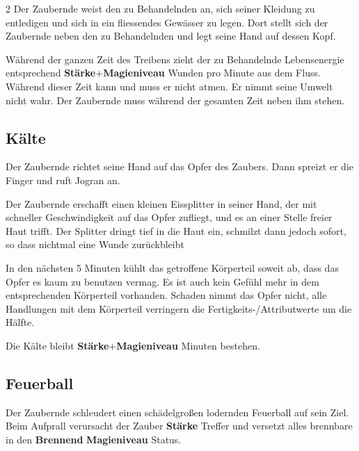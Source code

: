 \begin{multicols*}{2}
Der Zaubernde weist den zu Behandelnden an, sich seiner Kleidung zu entledigen und sich in ein fliessendes Gewässer zu legen. Dort stellt sich der Zaubernde neben den zu Behandelnden und legt seine Hand auf dessen Kopf.

Während der ganzen Zeit des Treibens zieht der zu Behandelnde Lebensenergie entsprechend \textbf{Stärke}+\textbf{Magieniveau} Wunden pro Minute aus dem Fluss. Während dieser Zeit kann und muss er nicht atmen. Er nimmt seine Umwelt nicht wahr. Der Zaubernde muss während der gesamten Zeit neben ihm stehen.



\subsection{Kälte}

Der Zaubernde richtet seine Hand auf das Opfer des Zaubers. Dann spreizt er die Finger und ruft Jogran an.

Der Zaubernde erschafft einen kleinen Eissplitter in seiner Hand, der mit schneller Geschwindigkeit auf das Opfer zufliegt, und es an einer Stelle freier Haut trifft. Der Splitter dringt tief in die Haut ein, schmilzt dann jedoch sofort, so dass nichtmal eine Wunde zurückbleibt

In den nächsten 5 Minuten kühlt das getroffene Körperteil soweit ab, dass das Opfer es kaum zu benutzen vermag. Es ist auch kein Gefühl mehr in dem entsprechenden Körperteil vorhanden. Schaden nimmt das Opfer nicht, alle Handlungen mit dem Körperteil verringern die Fertigkeits-/Attributwerte um die Hälfte.

Die Kälte bleibt \textbf{Stärke}+\textbf{Magieniveau} Minuten bestehen.



\subsection{Feuerball}

Der Zaubernde schleudert einen schädelgroßen lodernden Feuerball auf sein Ziel. Beim Aufprall verursacht der Zauber  \textbf{Stärke} Treffer und versetzt alles brennbare in den \textbf{Brennend} \textbf{Magieniveau} Status.


\end{multicols*}
